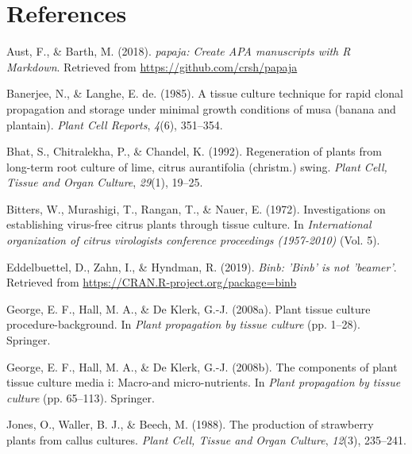 \documentclass[
  man]{apa6}
\begin{document}
\hypertarget{references}{%
\section{References}\label{references}}

\begingroup
\setlength{\parindent}{-0.5in}
\setlength{\leftskip}{0.5in}

\hypertarget{refs}{}
\leavevmode\hypertarget{ref-R-papaja}{}%
Aust, F., \& Barth, M. (2018). \emph{papaja: Create APA manuscripts with R Markdown}. Retrieved from \url{https://github.com/crsh/papaja}

\leavevmode\hypertarget{ref-banerjee1985tissue}{}%
Banerjee, N., \& Langhe, E. de. (1985). A tissue culture technique for rapid clonal propagation and storage under minimal growth conditions of musa (banana and plantain). \emph{Plant Cell Reports}, \emph{4}(6), 351--354.

\leavevmode\hypertarget{ref-bhat1992regeneration}{}%
Bhat, S., Chitralekha, P., \& Chandel, K. (1992). Regeneration of plants from long-term root culture of lime, citrus aurantifolia (christm.) swing. \emph{Plant Cell, Tissue and Organ Culture}, \emph{29}(1), 19--25.

\leavevmode\hypertarget{ref-bitters1972investigations}{}%
Bitters, W., Murashigi, T., Rangan, T., \& Nauer, E. (1972). Investigations on establishing virus-free citrus plants through tissue culture. In \emph{International organization of citrus virologists conference proceedings (1957-2010)} (Vol. 5).

\leavevmode\hypertarget{ref-R-binb}{}%
Eddelbuettel, D., Zahn, I., \& Hyndman, R. (2019). \emph{Binb: 'Binb' is not 'beamer'}. Retrieved from \url{https://CRAN.R-project.org/package=binb}

\leavevmode\hypertarget{ref-george2008plant}{}%
George, E. F., Hall, M. A., \& De Klerk, G.-J. (2008a). Plant tissue culture procedure-background. In \emph{Plant propagation by tissue culture} (pp. 1--28). Springer.

\leavevmode\hypertarget{ref-george2008components}{}%
George, E. F., Hall, M. A., \& De Klerk, G.-J. (2008b). The components of plant tissue culture media i: Macro-and micro-nutrients. In \emph{Plant propagation by tissue culture} (pp. 65--113). Springer.

\leavevmode\hypertarget{ref-jones1988production}{}%
Jones, O., Waller, B. J., \& Beech, M. (1988). The production of strawberry plants from callus cultures. \emph{Plant Cell, Tissue and Organ Culture}, \emph{12}(3), 235--241.
\end{document}
